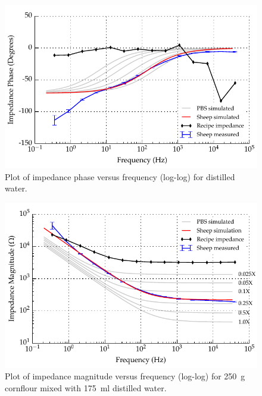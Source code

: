\begin{figure}
    \centering
    \includegraphics[width=\textwidth]{content/pt2/graphics/run12_600ml-distilledWater_ZVsF_graph_phase}
    \caption{\label{fig:recipe_water_phase}Plot of impedance phase versus frequency (log-log) for distilled water.}
\end{figure}

\begin{figure}
    \centering
    \includegraphics[width=\textwidth]{content/pt2/graphics/run14_170ml-distilledWater_250g-cornflour_ZVsF_graph_mag}
    \caption{\label{fig:recipe_cornflour_mag}Plot of impedance magnitude versus frequency (log-log) for \SI{250}{\gram} cornflour mixed with \SI{175}{\milli\litre} distilled water.}
\end{figure}

